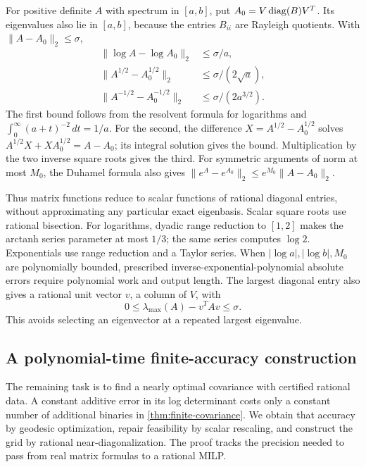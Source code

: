 For positive definite $A$ with spectrum in $[a,b]$, put
$A_0=V\operatorname{diag}(B)V^T$. Its eigenvalues also lie in $[a,b]$, because the
entries $B_{ii}$ are Rayleigh quotients. With $\|A-A_0\|_2\le\sigma$,
\begin{equation}\label{eq:matrix-function-bounds}
 \begin{split}
 \|\log A-\log A_0\|_2&\le\sigma/a,\\
 \|A^{1/2}-A_0^{1/2}\|_2&\le\sigma/(2\sqrt a),\\
 \|A^{-1/2}-A_0^{-1/2}\|_2&\le\sigma/(2a^{3/2}).
 \end{split}
\end{equation}
The first bound follows from the resolvent formula for logarithms and
$\int_0^\infty(a+t)^{-2}\,dt=1/a$. For the second, the difference
$X=A^{1/2}-A_0^{1/2}$ solves
$A^{1/2}X+XA_0^{1/2}=A-A_0$; its integral solution gives the bound.
Multiplication by the two inverse square roots gives the third. For
symmetric arguments of norm at most $M_0$, the Duhamel formula also gives
$\|e^A-e^{A_0}\|_2\le e^{M_0}\|A-A_0\|_2$.

Thus matrix functions reduce to scalar functions of rational diagonal
entries, without approximating any particular exact eigenbasis. Scalar
square roots use rational bisection. For logarithms, dyadic range reduction
to $[1,2]$ makes the arctanh series parameter at most $1/3$; the same
series computes $\log2$. Exponentials use range reduction and a Taylor
series. When $|\log a|,|\log b|,M_0$ are polynomially bounded, prescribed
inverse-exponential-polynomial absolute errors require polynomial work
and output length. The largest diagonal entry also gives a rational
unit vector $v$, a column of $V$, with
\begin{equation}\label{eq:rayleigh-residual}
 0\le\lambda_{\max}(A)-v^TAv\le\sigma.
\end{equation}
This avoids selecting an eigenvector at a repeated largest eigenvalue.

\subsection{A polynomial-time finite-accuracy construction}

The remaining task is to find a nearly optimal covariance with certified
rational data. A constant additive error in its log determinant costs
only a constant number of additional binaries in
\cref{thm:finite-covariance}. We obtain that accuracy by geodesic
optimization, repair feasibility by scalar rescaling, and construct the
grid by rational near-diagonalization. The proof tracks the precision
needed to pass from real matrix formulas to a rational MILP.

